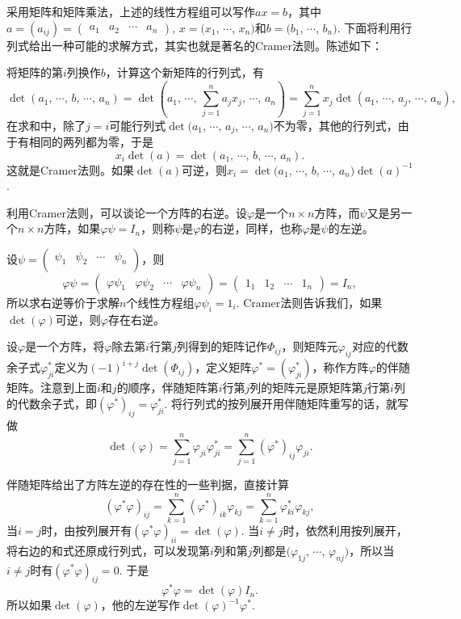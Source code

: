 采用矩阵和矩阵乘法，上述的线性方程组可以写作$ax=b$，其中$a=(a_{ij})=\begin{pmatrix}a_{1} & a_{2} & \cdots & a_{n}\end{pmatrix}$, $x=(x_1$, $\cdots$, $x_n)$和$b=(b_1$, $\cdots$, $b_n)$. 下面将利用行列式给出一种可能的求解方式，其实也就是著名的Cramer法则。陈述如下：

将矩阵的第$i$列换作$b$，计算这个新矩阵的行列式，有
\[
	\det(a_1,\,\cdots\!,\,b,\,\cdots\!,\,a_n)=\det\left(a_1,\,\cdots\!,\,\sum_{j=1}^na_j x_j,\,\cdots\!,\,a_n\right)=\sum_{j=1}^n x_j \det(a_1,\,\cdots\!,\,a_j,\,\cdots\!,\,a_n),
\]
在求和中，除了$j=i$可能行列式$\det(a_1$, $\cdots$, $a_j$, $\cdots$, $a_n)$不为零，其他的行列式，由于有相同的两列都为零，于是
\[
	x_i \det(a)=\det(a_1,\,\cdots\!,\,b,\,\cdots\!,\,a_n).
\]
这就是Cramer法则。如果$\det(a)$可逆，则$x_i=\det(a_1$, $\cdots$, $b$, $\cdots$, $a_n)\det(a)^{-1}$.

\para 利用Cramer法则，可以谈论一个方阵的右逆。设$\varphi$是一个$n\times n$方阵，而$\psi$又是另一个$n\times n$方阵，如果$\varphi\psi=I_n$，则称$\psi$是$\varphi$的右逆，同样，也称$\varphi$是$\psi$的左逆。

设$\psi=\begin{pmatrix}\psi_{1} & \psi_{2} & \cdots & \psi_{n}\\\end{pmatrix}$，则
\[
	\varphi\psi=\begin{pmatrix}\varphi\psi_{1} & \varphi\psi_{2} & \cdots & \varphi\psi_{n}\end{pmatrix}=\begin{pmatrix}1_{1} & 1_{2} & \cdots & 1_{n}\end{pmatrix}=I_n,
\]
所以求右逆等价于求解$n$个线性方程组$\varphi\psi_i=1_i$. Cramer法则告诉我们，如果$\det(\varphi)$可逆，则$\varphi$存在右逆。

\para 设$\varphi$是一个方阵，将$\varphi$除去第$i$行第$j$列得到的矩阵记作$\Phi_{ij}$，则矩阵元$\varphi_{ij}$对应的代数余子式$\varphi_{ji}^*$定义为$(-1)^{i+j}\det(\Phi_{ij})$，定义矩阵$\varphi^*=(\varphi_{ji}^*)$，称作方阵$\varphi$的伴随矩阵。注意到上面$i$和$j$的顺序，伴随矩阵第$i$行第$j$列的矩阵元是原矩阵第$j$行第$i$列的代数余子式，即$(\varphi^*)_{ij}=\varphi_{ji}^*$. 将行列式的按列展开用伴随矩阵重写的话，就写做
\[
	\det(\varphi)=\sum_{j=1}^n\varphi_{ji}\varphi_{ji}^*=\sum_{j=1}^n(\varphi^*)_{ij}\varphi_{ji}.
\]

伴随矩阵给出了方阵左逆的存在性的一些判据，直接计算
\[
	(\varphi^*\varphi)_{ij}=\sum_{k=1}^n(\varphi^*)_{ik}\varphi_{kj}=\sum_{k=1}^n\varphi^*_{ki}\varphi_{kj},
\]
当$i=j$时，由按列展开有$(\varphi^*\varphi)_{ii}=\det(\varphi)$. 当$i\neq j$时，依然利用按列展开，将右边的和式还原成行列式，可以发现第$i$列和第$j$列都是$(\varphi_{1j}$, $\cdots$, $\varphi_{nj})$，所以当$i\neq j$时有$(\varphi^*\varphi)_{ij}=0$. 于是
\[
	\varphi^*\varphi=\det(\varphi)I_n.
\]
所以如果$\det(\varphi)$，他的左逆写作$\det(\varphi)^{-1}\varphi^*$.

